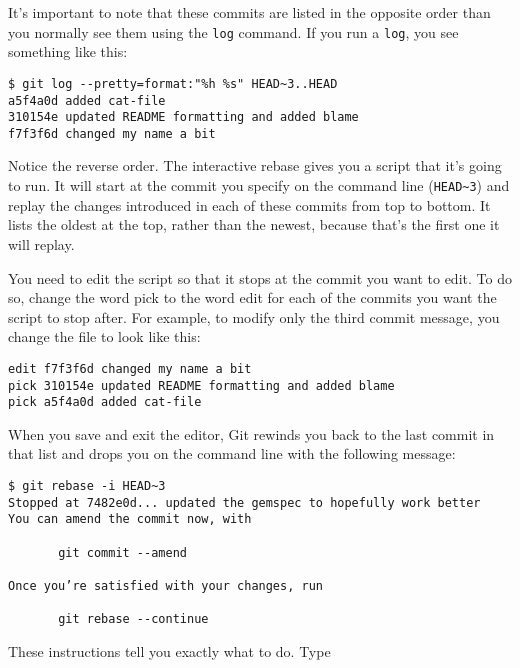 \documentclass[a4paper]{book}
\begin{document}
It's important to note that these commits are listed in the opposite order than you normally see them using the \texttt{log} command. If you run a \texttt{log}, you see something like this:

\begin{shaded}\begin{verbatim}
$ git log --pretty=format:"%h %s" HEAD~3..HEAD
a5f4a0d added cat-file
310154e updated README formatting and added blame
f7f3f6d changed my name a bit
\end{verbatim}\end{shaded}

Notice the reverse order. The interactive rebase gives you a script that it's going to run. It will start at the commit you specify on the command line (\texttt{HEAD\textasciitilde{}3}) and replay the changes introduced in each of these commits from top to bottom. It lists the oldest at the top, rather than the newest, because that's the first one it will replay.

You need to edit the script so that it stops at the commit you want to edit. To do so, change the word pick to the word edit for each of the commits you want the script to stop after. For example, to modify only the third commit message, you change the file to look like this:

\begin{shaded}\begin{verbatim}
edit f7f3f6d changed my name a bit
pick 310154e updated README formatting and added blame
pick a5f4a0d added cat-file
\end{verbatim}\end{shaded}

When you save and exit the editor, Git rewinds you back to the last commit in that list and drops you on the command line with the following message:

\begin{shaded}\begin{verbatim}
$ git rebase -i HEAD~3
Stopped at 7482e0d... updated the gemspec to hopefully work better
You can amend the commit now, with

       git commit --amend

Once you’re satisfied with your changes, run

       git rebase --continue
\end{verbatim}\end{shaded}

These instructions tell you exactly what to do. Type
\end{document}

